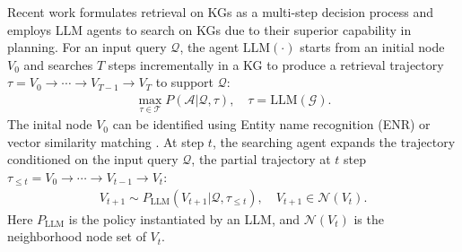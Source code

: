 Recent work formulates retrieval on KGs as a multi-step decision process \cite{sunthink,luoreasoning,li2025automating} and employs LLM agents to search on KGs due to their superior capability in planning.
For an input query $\mathcal{Q}$, the agent $\mathrm{LLM}(\cdot)$ starts from an initial node $V_{0}$ and searches $T$ steps incrementally in a KG to produce a retrieval trajectory
$\tau=V_{0}\rightarrow\cdots\rightarrow V_{T-1}\rightarrow V_{T}$ to support $\mathcal{Q}$:
\begin{equation}
    \begin{aligned}
    \max_{\tau\in\mathcal{T}} P(\mathcal{A}|\mathcal{Q},\tau), \quad \tau=\mathrm{LLM}(\mathcal{G}).
    \end{aligned}
    \label{obj:maxize_2}
\end{equation}
The inital node $V_{0}$ can be identified using
Entity name recognition (ENR) \cite{guo2024knowledgenavigator} or vector similarity matching \cite{sanmartin2024kg}.
At step $t$, the searching agent expands the trajectory conditioned on the input query $\mathcal{Q}$, the partial trajectory at $t$ step  $\tau_{\leq t}=V_{0}\rightarrow\cdots\rightarrow V_{t-1}\rightarrow V_{t}$:
\begin{equation}
    \begin{aligned}
    V_{t+1}\sim P_{\text{LLM}}(V_{t+1}|\mathcal{Q},\tau_{\leq t}),\quad V_{t+1}\in\mathcal{N}(V_{t}).
    \end{aligned}
\end{equation}
Here $P_{\text{LLM}}$ is the policy instantiated by an LLM, and $\mathcal{N}(V_{t})$ is the neighborhood node set of $V_{t}$.

